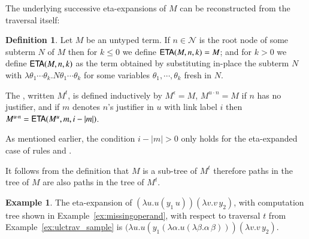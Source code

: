 \documentclass{elsarticle}
\theoremstyle{plain}
\theoremstyle{definition}
\newtheorem{definition}{Definition}[section]
\newtheorem{example}{Example}[section]
\theoremstyle{remark}
\newcommand\Nodes{\mathcal{N}}%
\begin{document}
The underlying successive eta-expansions of $M$ can be reconstructed from the traversal itself:
\begin{definition}
\label{def:onthefly_etaexpansion}
Let $M$ be an untyped term. If $n\in \Nodes$ is the root node of some subterm $N$ of $M$ then
for $k \leq 0$ we define ${\sf ETA}(M, n, k) = M$; and for $k> 0$ we define ${\sf ETA}(M, n, k)$ as the term obtained by substituting in-place the subterm $N$ with $\lambda\theta_1 \cdots \theta_k. N \theta_1 \cdots \theta_k$ for some variables $\theta_1, \cdots, \theta_k$ fresh in $N$.

The , written $M^t$, is defined inductively by $M^\epsilon = M$,
$M^{u \cdot n} = M$ if $n$ has no justifier, and if $m$ denotes $n$'s justifier in $u$ with link label $i$ then $M^{u \cdot n} = {\sf ETA}(M^{u}, m, i-|m|)$.
\end{definition}
As mentioned earlier, the condition  $i-|m|>0$ only holds for the eta-expanded case of rules  and .

It follows from the definition that $M$ is a sub-tree of $M^t$ therefore paths in the tree of $M$ are also paths in the tree of $M^t$.

\begin{example}
The eta-expansion of $(\lambda u . u(y_1\,u)) (\lambda v . v\,y_2)$, with computation tree shown in Example~\ref{ex:missingoperand}, with respect to traversal $t$ from Example~\ref{ex:ulctrav_sample} is
$(\lambda u . u(y_1 (\lambda \alpha. u (\lambda \beta.\alpha\,\beta))) (\lambda v . v\,y_2)$.
\end{example}
\end{document}
